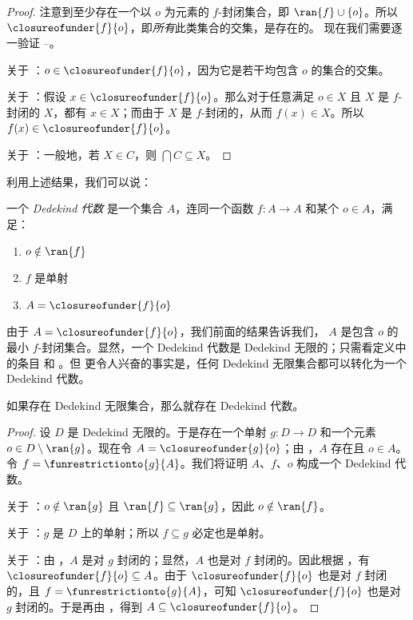 \documentclass[../../../include/open-logic-section]{subfiles}
\begin{document}
\begin{proof}
注意到至少存在一个以 $o$ 为元素的 $f$-封闭集合，即 $\ran{f}\cup
\{o\}$。所以 $\closureofunder{f}{o}$，即\emph{所有}此类集合的交集，是存在的。
现在我们需要逐一验证
--。

关于 ：$o \in \closureofunder{f}{o}$，因为它是若干均包含 $o$ 的集合的交集。

关于 ：假设 $x \in \closureofunder{f}{o}$。那么对于任意满足 $o \in X$ 且 $X$ 是 $f$-封闭的 $X$，都有 $x \in X$；而由于 $X$ 是
$f$-封闭的，从而 $f(x) \in X$。所以 $f(x) \in \closureofunder{f}{o}$。

关于 ：一般地，若 $X
\in C$，则 $\bigcap C \subseteq X$。
\end{proof}

利用上述结果，我们可以说：

\begin{defn}
一个 \emph{Dedekind 代数} 是一个集合 $A$，连同一个函数 $f
\colon A \to A$ 和某个 $o \in A$，满足：
	\begin{enumerate}
		\item {} $o \notin \ran{f}$
		\item {} $f$ 是单射
		\item {} $A = \closureofunder{f}{o}$
	\end{enumerate}
\end{defn}

由于 $A = \closureofunder{f}{o}$，我们前面的结果告诉我们，
$A$ 是包含 $o$ 的最小 $f$-封闭集合。显然，一个
Dedekind 代数是 Dedekind 无限的；只需看定义中的条目
 和 。但
更令人兴奋的事实是，任何 Dedekind 无限集合都可以转化为一个 Dedekind 代数。

\begin{thm}
如果存在 Dedekind 无限集合，那么就存在 Dedekind 代数。
\end{thm}

\begin{proof}
设 $D$ 是 Dedekind 无限的。于是存在一个单射 $g \colon D \to
D$ 和一个元素 $o  \in D \setminus \ran{g}$。现在令 $A =
\closureofunder{g}{o}$；由 ，$A$ 存在且 $o \in A$。令 $f =
\funrestrictionto{g}{A}$。我们将证明 $A$、$f$、$o$ 构成一个 Dedekind
代数。

关于 ：$o \notin \ran{g}$ 且 $\ran{f}
\subseteq \ran{g}$，因此 $o\notin \ran{f}$。

关于 ：$g$ 是 $D$ 上的单射；所以 $f
\subseteq g$ 必定也是单射。

关于 ：由 ，$A$ 是对 $g$ 封闭的；显然，$A$ 也是对 $f$ 封闭的。因此根据 ，有 $\closureofunder{f}{o} \subseteq A$。由于 $\closureofunder{f}{o}$ 也是对 $f$ 封闭的，且 $f = \funrestrictionto{g}{A}$，可知 $\closureofunder{f}{o}$ 也是对 $g$ 封闭的。于是再由 ，得到 $A \subseteq \closureofunder{f}{o}$。
\end{proof}
\end{document}
